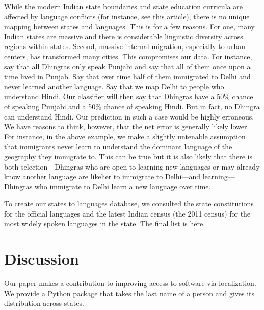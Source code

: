 \documentclass[11pt,  letterpaper]{article}
\begin{document}
While the modern Indian state boundaries and state education curricula are affected by language conflicts (for instance, see this \href{https://en.wikipedia.org/wiki/Anti-Hindi_agitations_of_Tamil_Nadu}{article}), there is no unique mapping between states and languages. This is for a few reasons. For one, many Indian states are massive and there is considerable linguistic diversity across regions within states. Second, massive internal migration, especially to urban centers, has transformed many cities. This compromises our data. For instance, say that all Dhingras only speak Punjabi and say that all of them once upon a time lived in Punjab. Say that over time half of them immigrated to Delhi and never learned another language. Say that we map Delhi to people who understand Hindi. Our classifier will then say that Dhingras have a 50\% chance of speaking Punjabi and a 50\% chance of speaking Hindi. But in fact, no Dhingra can understand Hindi. Our prediction in such a case would be highly erroneous. We have reasons to think, however, that the net error is generally likely lower. For instance, in the above example, we make a slightly untenable assumption that immigrants never learn to understand the dominant language of the geography they immigrate to. This can be true but it is also likely that there is both selection—Dhingras who are open to learning new languages or may already know another language are likelier to immigrate to Delhi—and learning—Dhingras who immigrate to Delhi learn a new language over time. 

To create our states to languages database, we consulted the state constitutions for the official languages and the latest Indian census (the 2011 census) for the most widely spoken languages in the state. The final list is here.

\section{Discussion}

Our paper makes a contribution to improving access to software via localization. We provide a Python package that takes the last name of a person and gives its distribution across states. 
\end{document}
